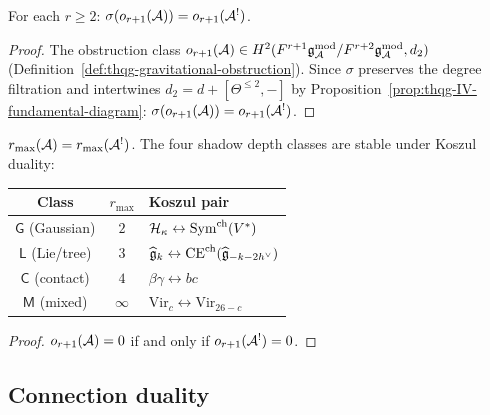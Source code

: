 \begin{corollary}
For each $r \geq 2$:
$\sigma(o_{r+1}(\mathcal{A})) = o_{r+1}(\mathcal{A}^!)$.
\end{corollary}

\begin{proof}
The obstruction class $o_{r+1}(\mathcal{A})
\in H^2(F^{r+1}\mathfrak{g}_{\mathcal{A}}^{\mathrm{mod}}/F^{r+2}\mathfrak{g}_{\mathcal{A}}^{\mathrm{mod}}, d_2)$
(Definition~\ref{def:thqg-gravitational-obstruction}).
Since $\sigma$ preserves the degree filtration and intertwines
$d_2 = d + [\Theta^{\leq 2}, -]$ by Proposition~\ref{prop:thqg-IV-fundamental-diagram}:
$\sigma(o_{r+1}(\mathcal{A})) = o_{r+1}(\mathcal{A}^!)$.
\end{proof}

\begin{corollary}
\label{cor:thqg-IV-shadow-depth}
$r_{\max}(\mathcal{A}) = r_{\max}(\mathcal{A}^!)$.
The four shadow depth classes are stable under Koszul duality:
\begin{center}
\renewcommand{\arraystretch}{1.2}
\begin{tabular}{ccl}
\textbf{Class} & $r_{\max}$ & \textbf{Koszul pair} \\
\hline
$\mathsf{G}$ (Gaussian) & $2$ &
$\mathcal{H}_\kappa \leftrightarrow \mathrm{Sym}^{\mathrm{ch}}(V^*)$ \\
$\mathsf{L}$ (Lie/tree) & $3$ &
$\widehat{\mathfrak{g}}_k \leftrightarrow \mathrm{CE}^{\mathrm{ch}}(\widehat{\mathfrak{g}}_{-k-2h^\vee})$ \\
$\mathsf{C}$ (contact) & $4$ &
$\beta\gamma \leftrightarrow bc$ \\
$\mathsf{M}$ (mixed) & $\infty$ &
$\mathrm{Vir}_c \leftrightarrow \mathrm{Vir}_{26-c}$ \\
\end{tabular}
\end{center}
\end{corollary}

\begin{proof}
$o_{r+1}(\mathcal{A}) = 0$ if and only if $o_{r+1}(\mathcal{A}^!) = 0$.
\end{proof}

%
%

\subsection{Connection duality}

